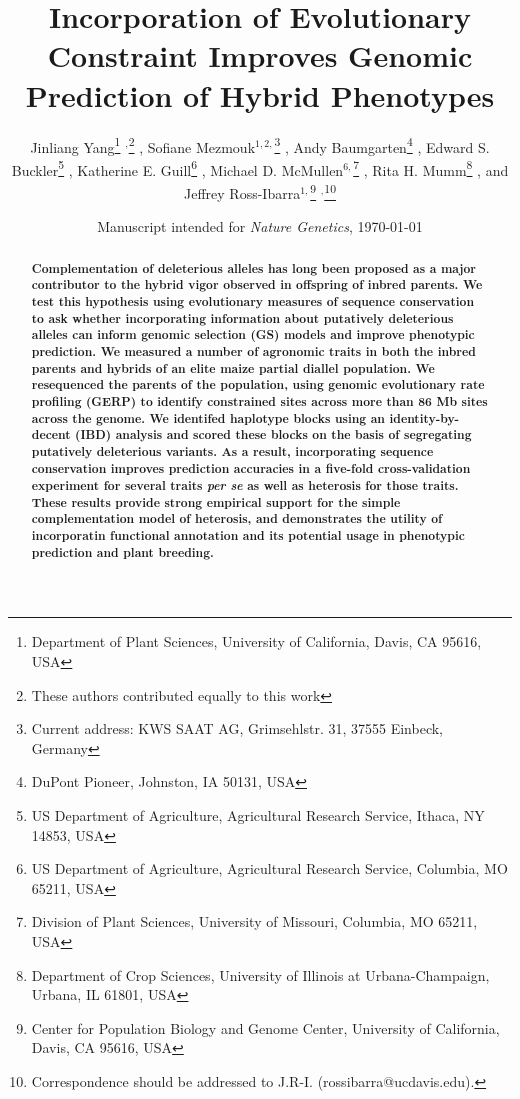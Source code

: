 \documentclass[twoside,twocolumn, letterpaper]{article}
\title{Incorporation of Evolutionary Constraint Improves Genomic Prediction of Hybrid Phenotypes}
\author{
Jinliang Yang\thanks{Department of Plant Sciences, University of California, Davis, CA 95616, USA} $^,$\thanks{These authors contributed equally to this work} \hspace{0.5mm}, 
Sofiane Mezmouk$^{1,2,}$\thanks{Current address: KWS SAAT AG, Grimsehlstr. 31, 37555 Einbeck, Germany} \hspace{0.5mm}, 
Andy Baumgarten\thanks{DuPont Pioneer, Johnston, IA 50131, USA} \hspace{0.5mm}, 
Edward S. Buckler\thanks{US Department of Agriculture, Agricultural Research Service, Ithaca, NY 14853, USA} \hspace{0.5mm}, 
Katherine E. Guill\thanks{US Department of Agriculture, Agricultural Research Service, Columbia, MO 65211, USA} \hspace{0.5mm},
Michael D. McMullen$^{6,}$\thanks{Division of Plant Sciences, University of Missouri, Columbia, MO 65211, USA} \hspace{0.5mm},
Rita H. Mumm\thanks{Department of Crop Sciences, University of Illinois at Urbana-Champaign, Urbana, IL 61801, USA} \hspace{0.5mm},
and Jeffrey Ross-Ibarra$^{1,}$\thanks{Center for Population Biology and Genome Center, University of California, Davis, CA 95616, USA} $^,$\thanks{Correspondence should be addressed to J.R-I. (rossibarra@ucdavis.edu).}\hspace{0.5mm}
}
\date{\small Manuscript intended for \emph{Nature Genetics}, \today}
\begin{document}
 
\maketitle

\begin{abstract}
\noindent \bf
\noindent
Complementation of deleterious alleles has long been proposed as a major contributor to the hybrid vigor observed in offspring of inbred parents. 
We test this hypothesis using evolutionary measures of sequence conservation to ask whether incorporating information about putatively deleterious alleles can inform genomic selection (GS) models and improve phenotypic prediction.
We measured a number of agronomic traits in both the inbred parents and hybrids of an elite maize partial diallel population. 
We resequenced the parents of the population, using genomic evolutionary rate profiling (GERP) to identify constrained sites across more than 86 Mb sites across the genome.  
We identifed haplotype blocks using an identity-by-decent (IBD) analysis and scored these blocks on the basis of segregating putatively deleterious variants. 
As a result, incorporating sequence conservation improves prediction accuracies in a five-fold cross-validation experiment for several traits \emph{per se} as well as heterosis for those traits. 
These results provide strong empirical support for the simple complementation model of heterosis, and demonstrates the utility of incorporatin functional annotation and its potential usage in phenotypic prediction and plant breeding. 

\end{abstract}

\vspace{6mm}




\noindent %
\end{document}
